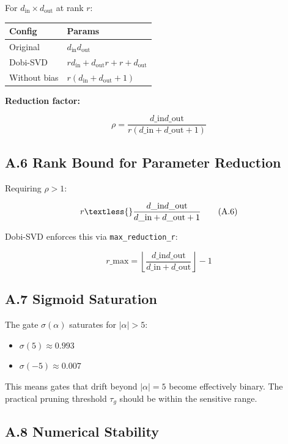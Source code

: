 For $d_\text{in} \times d_\text{out}$ at rank $r$:

\begin{table}[H]
\centering
\small
\begin{tabular}{ll}
\toprule
\textbf{Config} & \textbf{Params} \\
\midrule
Original & $d_\text{in} d_\text{out}$ \\
Dobi-SVD & $r d_\text{in} + d_\text{out} r + r + d_\text{out}$ \\
Without bias & $r(d_\text{in} + d_\text{out} + 1)$ \\
\bottomrule
\end{tabular}
\end{table}

\textbf{Reduction factor:}

\[
\rho = \frac{d\_\text{in} d\_\text{out}}{r(d\_\text{in} + d\_\text{out} + 1)}
\tag{A.5}
\]

\subsection{A.6 Rank Bound for Parameter Reduction}

Requiring $\rho > 1$:

\[
r \textless{} \frac{d\_\text{in} d\_\text{out}}{d\_\text{in} + d\_\text{out} + 1}
\tag{A.6}
\]

Dobi-SVD enforces this via \texttt{max\_reduction\_r}:

\[
r\_\text{max} = \left\lfloor \frac{d\_\text{in} d\_\text{out}}{d\_\text{in} + d\_\text{out}} \right\rfloor - 1
\tag{A.7}
\]

\subsection{A.7 Sigmoid Saturation}

The gate $\sigma(\alpha)$ saturates for $|\alpha| > 5$:

\begin{itemize}
\item $\sigma(5) \approx 0.993$
\item $\sigma(-5) \approx 0.007$

\end{itemize}
This means gates that drift beyond $|\alpha| = 5$ become effectively binary. 
The practical pruning threshold $\tau_g$ should be within the sensitive range.

\subsection{A.8 Numerical Stability}

